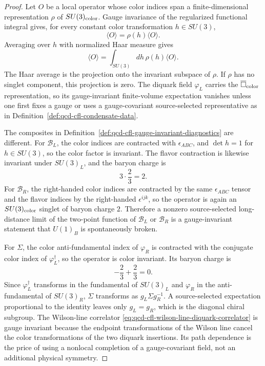 \begin{proof}
Let \(O\) be a local operator whose color indices span a finite-dimensional
representation \(\rho\) of \(SU(3)_{\rm color}\).  Gauge invariance of the
regularized functional integral gives, for every constant color
transformation \(h\in SU(3)\),
\[
  \langle O\rangle=\rho(h)\langle O\rangle .
\]
Averaging over \(h\) with normalized Haar measure gives
\[
  \langle O\rangle
  =
  \int_{SU(3)}dh\,\rho(h)\langle O\rangle .
\]
The Haar average is the projection onto the invariant subspace of
\(\rho\).  If \(\rho\) has no singlet component, this projection is zero.
The diquark field \(\varphi_L\) carries the
\(\overline{\square}_{\rm color}\) representation, so its gauge-invariant
finite-volume expectation vanishes unless one first fixes a gauge or uses a
gauge-covariant source-selected representative as in
Definition~\ref{def:qcd-cfl-condensate-data}.

The composites in
Definition~\ref{def:qcd-cfl-gauge-invariant-diagnostics} are different.
For \(\mathcal B_L\), the color indices are contracted with
\(\epsilon_{ABC}\), and \(\det h=1\) for \(h\in SU(3)\), so the color
factor is invariant.  The flavor contraction is likewise invariant under
\(SU(3)_L\), and the baryon charge is
\[
  3\cdot\frac23=2 .
\]
For \(\mathcal B_R\), the right-handed color indices are contracted by the
same \(\epsilon_{ABC}\) tensor and the flavor indices by the right-handed
\(\epsilon^{ijk}\), so the operator is again an \(SU(3)_{\rm color}\)
singlet of baryon charge \(2\).  Therefore a nonzero source-selected
long-distance limit of the two-point function of \(\mathcal B_L\) or
\(\mathcal B_R\) is a gauge-invariant statement that \(U(1)_B\) is
spontaneously broken.

For \(\Sigma\), the color anti-fundamental index of \(\varphi_R\) is
contracted with the conjugate color index of \(\varphi_L^\dagger\), so the
operator is color invariant.  Its baryon charge is
\[
  -\frac23+\frac23=0.
\]
Since \(\varphi_L^\dagger\) transforms in the fundamental of \(SU(3)_L\)
and \(\varphi_R\) in the anti-fundamental of \(SU(3)_R\), \(\Sigma\)
transforms as \(g_L\Sigma g_R^{-1}\).  A source-selected expectation
proportional to the identity leaves only \(g_L=g_R\), which is the diagonal
chiral subgroup.  The Wilson-line correlator
\eqref{eq:qcd-cfl-wilson-line-diquark-correlator} is gauge invariant
because the endpoint transformations of the Wilson line cancel the color
transformations of the two diquark insertions.  Its path dependence is the
price of using a nonlocal completion of a gauge-covariant field, not an
additional physical symmetry.
\end{proof}

